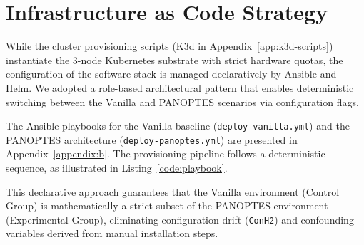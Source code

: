 \section{Infrastructure as Code Strategy}
\label{sec:iac-strategy}

While the cluster provisioning scripts (K3d in Appendix~\ref{app:k3d-scripts}) instantiate the 3-node Kubernetes substrate with strict hardware quotas, the configuration of the software stack is managed declaratively by Ansible and Helm. We adopted a role-based architectural pattern that enables deterministic switching between the Vanilla and PANOPTES scenarios via configuration flags.

The Ansible playbooks for the Vanilla baseline (\texttt{deploy-vanilla.yml}) and the PANOPTES architecture (\texttt{deploy-panoptes.yml}) are presented in Appendix~\ref{appendix:b}. The provisioning pipeline follows a deterministic sequence, as illustrated in Listing~\ref{code:playbook}.



This declarative approach guarantees that the Vanilla environment (Control Group) is mathematically a strict subset of the PANOPTES environment (Experimental Group), eliminating configuration drift (\texttt{ConH2}) and confounding variables derived from manual installation steps.

